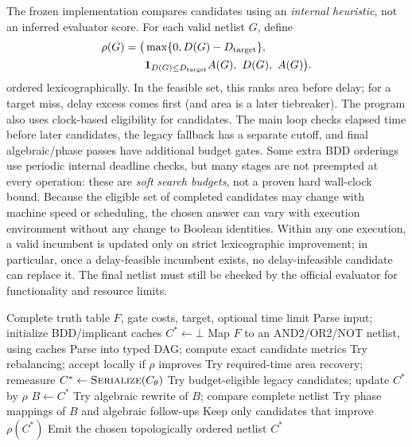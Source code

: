 \documentclass[journal,10pt]{IEEEtran}
\begin{document}
The frozen implementation compares candidates using an \emph{internal heuristic}, not an inferred evaluator score. For each valid netlist $G$, define
\begin{equation}\label{eq:rank}
\begin{split}
\rho(G)=\big(&\max\{0,D(G)-D_{\rm target}\},\\
&\mathbf1_{D(G)\le D_{\rm target}}A(G),\ D(G),\ A(G)\big).
\end{split}
\end{equation}
ordered lexicographically. In the feasible set, this ranks area before delay; for a target miss, delay excess comes first (and area is a later tiebreaker). The program also uses clock-based eligibility for candidates. The main loop checks elapsed time before later candidates, the legacy fallback has a separate cutoff, and final algebraic/phase passes have additional budget gates. Some extra BDD orderings use periodic internal deadline checks, but many stages are not preempted at every operation: these are \emph{soft search budgets}, not a proven hard wall-clock bound. Because the eligible set of completed candidates may change with machine speed or scheduling, the chosen answer can vary with execution environment without any change to Boolean identities. Within any one execution, a valid incumbent is updated only on strict lexicographic improvement; in particular, once a delay-feasible incumbent exists, no delay-infeasible candidate can replace it. The final netlist must still be checked by the official evaluator for functionality and resource limits.
\begin{algorithm}[t]
\caption{Frozen Round 5.1 control-flow overview}\label{alg:synth}
\begin{algorithmic}[1]
\Require Complete truth table $F$, gate costs, target, optional time limit
\State Parse input; initialize BDD/implicant caches
\State $C^*\gets\bot$ 
  \State Map $F$ to an AND2/OR2/NOT netlist, using caches
  \State Parse into typed DAG; compute exact candidate metrics
  \State Try rebalancing; accept locally if $\rho$ improves
     \State Try required-time area recovery; remeasure
  \EndIf
     \State $C^*\gets\textsc{Serialize}(C_\theta)$
  \EndIf
\EndFor
\State Try budget-eligible legacy candidates; update $C^*$ by $\rho$
\State $B\gets C^*$ 
  \State Try algebraic rewrite of $B$; compare complete netlist
  \State Try phase mappings of $B$ and algebraic follow-ups
  \State Keep only candidates that improve $\rho(C^*)$
\EndIf
\State Emit the chosen topologically ordered netlist $C^*$
\end{algorithmic}
\end{algorithm}
\end{document}
